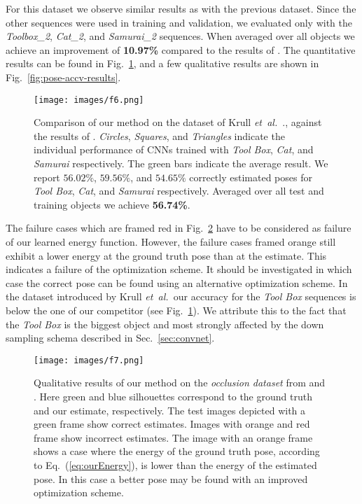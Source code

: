 \documentclass[10pt,letterpaper]{article}
\newcommand{\etal}{\mbox{\emph{et al.\ }}}
\begin{document}
\noindent{\bf Dataset of Krull \etal}
For this dataset we observe similar results as with the previous dataset. Since the other sequences were used in training and validation, we evaluated only with the \emph{Toolbox\_2}, \emph{Cat\_2}, and \emph{Samurai\_2} sequences. When averaged over all objects we achieve an improvement of {\bf 10.97\%} compared to the results of \cite{brachmann2014}. The quantitative results can be found in Fig.~\ref{fig:comp-accv14}, and a few qualitative results are shown in Fig.~\ref{fig:pose-accv-results}. 

\begin{figure}[!ht]
\begin{center}
\texttt{[image: images/f6.png]}
\end{center}
   \caption{Comparison of our method on the dataset of Krull \etal., against the results of \cite{brachmann2014}.  \emph{Circles}, \emph{Squares}, and \emph{Triangles} indicate the individual performance of CNNs trained with \emph{Tool Box}, \emph{Cat}, and \emph{Samurai} respectively. The green bars indicate the average result. We report $56.02\%$, $59.56\%$, and $54.65\%$ correctly estimated poses for \emph{Tool Box}, \emph{Cat}, and \emph{Samurai} respectively. Averaged over all test and training objects we achieve {\bf 56.74\%}.}
\label{fig:comp-accv14}
\end{figure}

The failure cases which are framed red in Fig.~\ref{fig:pose-results} have to be considered as failure of our learned energy function. However, the failure cases framed orange still exhibit a lower energy at the ground truth pose than at the estimate.
This indicates a failure of the optimization scheme. It should be investigated in which case the correct pose can be found using an alternative optimization scheme. 
In the dataset introduced by Krull \etal our accuracy for the \emph{Tool Box} sequences is below the one of our competitor (see Fig.~\ref{fig:comp-accv14}).
We attribute this to the fact that the \emph{Tool Box} is the biggest object and most strongly affected by the down sampling schema described in Sec.~\ref{sec:convnet}.

\begin{figure}[!ht]
\begin{center}
\texttt{[image: images/f7.png]}
\end{center}
   \caption{Qualitative results of our method on the \emph{occlusion dataset} from \cite{brachmann2014} and \cite{hinterstoisser2012accv}. Here green and blue silhouettes correspond to the ground truth and our estimate, respectively. The test images depicted with a green frame show correct estimates. Images with orange and red frame show incorrect estimates. The image with an orange frame shows a case where the energy of the ground truth pose, according to Eq.~(\ref{eq:ourEnergy}), is lower than the energy of the estimated pose. In this case a better pose may be found with an improved optimization scheme.}
\label{fig:pose-results}
\end{figure}
\end{document}

